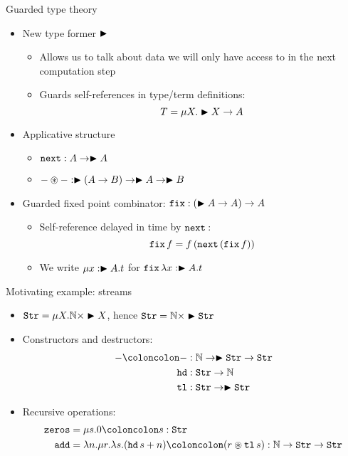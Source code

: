 \documentclass{beamer}
\newcommand{\lamb}[2]{\lambda #1. #2}
\newcommand{\recu}[2]{\mu #1. #2}
\begin{document}
\begin{frame}{Guarded type theory}
\begin{itemize}
    \item<1-> New type former $\blacktriangleright$
    \begin{itemize}
        \item Allows us to talk about data we will only have access to in the next computation step
        \item Guards self-references in type/term definitions:
        \[ T = \mu X. \blacktriangleright{X} \to A \]
    \end{itemize}
    \item<2-> Applicative structure
    \begin{itemize}
        \item $\mathtt{next} : A \to \blacktriangleright{A}$
        \item $- \circledast - : \blacktriangleright{(A \to B)} \to \blacktriangleright{A} \to \blacktriangleright{B}$
    \end{itemize}
    \item<3-> Guarded fixed point combinator: $\mathtt{fix} : (\blacktriangleright{A} \to A) \to A$
    \begin{itemize}
        \item Self-reference delayed in time by $\nxt$:
        \[ \mathtt{fix}\, f = f\, (\mathtt{next}\, (\mathtt{fix}\, f)) \]
        \item We write $\mu x : \blacktriangleright{A}. t$ for
        $\mathtt{fix}\, \lambda x : \blacktriangleright{A}. t$
    \end{itemize}
\end{itemize}
\end{frame}

\begin{frame}{Motivating example: streams}
\begin{itemize}
    \item<1-> $\mathtt{Str} = \mu X. \mathbb{N} \times \blacktriangleright{X}$, hence $\mathtt{Str} = \mathbb{N} \times \blacktriangleright{\mathtt{Str}}$
    \item<2-> Constructors and destructors: \vspace{-6pt}
    \begin{align*}
        - \cons - &: \N \to \Later{\Str} \to \Str \\
        \name{hd} &: \Str \to \N \\
        \name{tl} &: \Str \to \Later{\Str} \\
    \end{align*}
    \item<3-> Recursive operations: \vspace{-6pt}
    \begin{align*}
        \name{zeros} &= \recu{s}{0 \cons s} : \Str \\
        \name{add} &= \lamb{n}{\recu{r}{\lamb{s}{
            (\app{\hd}{s} + n) \cons (r \ap \app{\tl}{s})}}} : \N \to \Str \to \Str \\
    \end{align*}
\end{itemize}
\end{frame}
\end{document}
